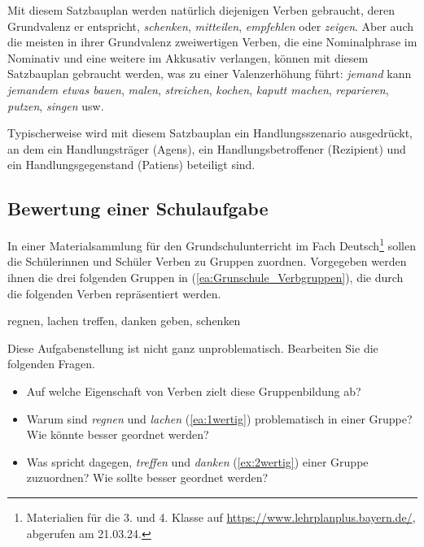Mit diesem Satzbauplan werden natürlich diejenigen Verben gebraucht, deren Grundvalenz er entspricht, \zB \textit{schenken}, \textit{mitteilen}, \textit{empfehlen} oder \textit{zeigen}. Aber auch die meisten in ihrer Grundvalenz zweiwertigen Verben, die eine Nominalphrase im Nominativ und eine weitere im Akkusativ verlangen, können mit diesem Satzbauplan gebraucht werden, was zu einer Valenzerhöhung führt: \textit{jemand} kann \textit{jemandem} \textit{etwas bauen}, \textit{malen}, \textit{streichen}, \textit{kochen}, \textit{kaputt machen}, \textit{reparieren}, \textit{putzen}, \textit{singen} usw.

Typischerweise wird mit diesem Satzbauplan ein Handlungsszenario ausgedrückt, an dem ein Handlungsträger (Agens), ein Handlungsbetroffener (Rezipient) und ein Handlungsgegenstand (Patiens) beteiligt sind.


\subsection{Bewertung einer Schulaufgabe}\label{subsection:Aufgabe_Valenz3}

In einer Materialsammlung für den Grundschulunterricht im Fach Deutsch\footnote{Materialien für die 3. und 4. Klasse auf \url{https://www.lehrplanplus.bayern.de/}, abgerufen am 21.03.24.} sollen die Schülerinnen und Schüler Verben zu Gruppen zuordnen. Vorgegeben werden ihnen die drei folgenden Gruppen in (\ref{ea:Grunschule_Verbgruppen}), die durch die folgenden Verben repräsentiert werden.

\ea \label{ea:Grunschule_Verbgruppen}
\ea \label{ea:1wertig} regnen, lachen
\ex \label{ex:2wertig} treffen, danken
\ex \label{ex:3wertig} geben, schenken
\z 
\z 

Diese Aufgabenstellung ist nicht ganz unproblematisch. Bearbeiten Sie die folgenden Fragen.

\begin{itemize}

\item Auf welche Eigenschaft von Verben zielt diese Gruppenbildung ab?

\item Warum sind \textit{regnen} und \textit{lachen} (\ref{ea:1wertig}) problematisch in einer Gruppe? Wie könnte besser geordnet werden?

\item Was spricht dagegen, \textit{treffen} und \textit{danken} (\ref{ex:2wertig}) einer Gruppe zuzuordnen? Wie sollte besser geordnet werden?

\end{itemize} 


